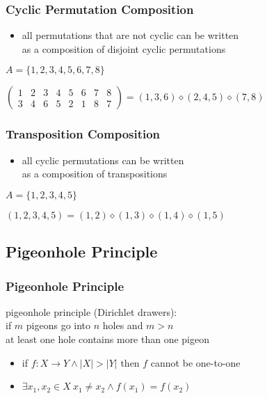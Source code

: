 \documentclass[dvipsnames]{beamer}
\begin{document}
\begin{frame}
  \frametitle{Cyclic Permutation Composition}

  \begin{itemize}
    \item all permutations that are not cyclic can be written\\
      as a composition of disjoint cyclic permutations
  \end{itemize}

  \pause
  \begin{example}
    $A = \{1,2,3,4,5,6,7,8\}$

    \medskip
    $\left(
      \begin{array}{cccccccc}
        1 & 2 & 3 & 4 & 5 & 6 & 7 & 8\\
        3 & 4 & 6 & 5 & 2 & 1 & 8 & 7
      \end{array}
    \right) = (1,3,6) \diamond (2,4,5) \diamond (7,8)$
  \end{example}
\end{frame}

\begin{frame}
  \frametitle{Transposition Composition}

  \begin{itemize}
    \item all cyclic permutations can be written\\
      as a composition of transpositions
  \end{itemize}

  \pause
  \begin{example}
    $A = \{1,2,3,4,5\}$

    \medskip
    $(1,2,3,4,5) = (1,2) \diamond (1,3) \diamond (1,4) \diamond (1,5)$
  \end{example}
\end{frame}

\subsection{Pigeonhole Principle}

\begin{frame}
  \frametitle{Pigeonhole Principle}

  \begin{definition}
    \alert{pigeonhole principle} (Dirichlet drawers):\\
    if $m$ pigeons go into $n$ holes and $m>n$ \\
    at least one hole contains more than one pigeon
  \end{definition}

  \pause
  \begin{itemize}
    \item if $f: X \rightarrow Y \wedge |X|>|Y|$ then $f$ cannot be one-to-one

    \item $\exists x_1,x_2 \in X~x_1 \neq x_2 \wedge f(x_1)=f(x_2)$
  \end{itemize}
\end{frame}
\end{document}
